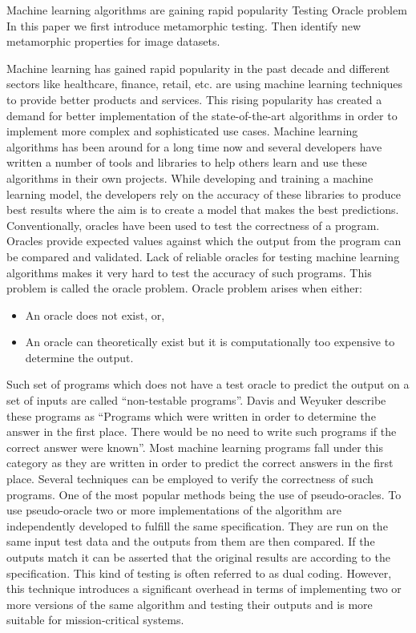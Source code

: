 Machine learning algorithms are gaining rapid popularity 
Testing 
Oracle problem
In this paper we first introduce metamorphic testing. Then identify new metamorphic properties for image datasets.

Machine learning has gained rapid popularity in the past decade and different sectors like healthcare, finance, retail, etc. are using machine learning techniques to provide better products and services. This rising popularity has created a demand for better implementation of the state-of-the-art algorithms in order to implement more complex and sophisticated use cases. Machine learning algorithms has been around for a long time now and several developers have written a number of tools and libraries to help others learn and use these algorithms in their own projects.  While developing and training a machine learning model, the developers rely on the accuracy of these libraries to produce best results where the aim is to create a model that makes the best predictions.
Conventionally, oracles have been used to test the correctness of a program. Oracles provide expected values against which the output from the program can be compared and validated. Lack of reliable oracles for testing machine learning algorithms makes it very hard to test the accuracy of such programs. This problem is called the oracle problem\cite{Weyuker}. Oracle problem arises when either:
\begin{itemize}
  \item An oracle does not exist, or,
  \item An oracle can theoretically exist but it is computationally too expensive to determine the output.
\end{itemize}
Such set of programs which does not have a test oracle to predict the output on a set of inputs are called \enquote{non-testable programs}\cite{Weyuker}. Davis and Weyuker describe these programs as \enquote{Programs which were written in order to determine the answer in the first place. There would be no need to write such programs if the correct answer were known}\cite{Davis1981}. Most machine learning programs fall under this category as they are written in order to predict the correct answers in the first place. Several techniques can be employed to verify the correctness of such programs. One of the most popular methods being the use of pseudo-oracles. To use pseudo-oracle two or more implementations of the algorithm are independently developed to fulfill the same specification. They are run on the same input test data and the outputs from them are then compared. If the outputs match it can be asserted that the original results are according to the specification. This kind of testing is often referred to as dual coding. However, this technique introduces a significant overhead in terms of implementing two or more versions of the same algorithm and testing their outputs and is more suitable for mission-critical systems\cite{Weyuker}.\newline

